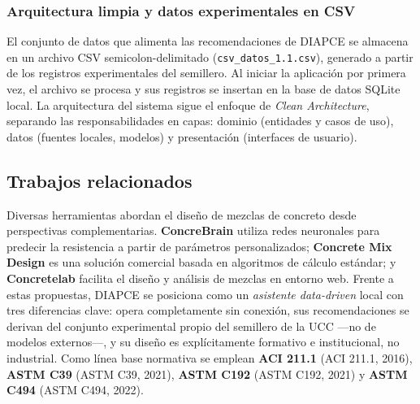 \subsubsection*{Arquitectura limpia y datos experimentales en CSV}

El conjunto de datos que alimenta las recomendaciones de DIAPCE se almacena en un archivo CSV semicolon-delimitado (\texttt{csv\_datos\_1.1.csv}), generado a partir de los registros experimentales del semillero. Al iniciar la aplicación por primera vez, el archivo se procesa y sus registros se insertan en la base de datos SQLite local. La arquitectura del sistema sigue el enfoque de \textit{Clean Architecture}, separando las responsabilidades en capas: dominio (entidades y casos de uso), datos (fuentes locales, modelos) y presentación (interfaces de usuario).

\subsection{Trabajos relacionados}

Diversas herramientas abordan el diseño de mezclas de concreto desde perspectivas complementarias. \textbf{ConcreBrain} utiliza redes neuronales para predecir la resistencia a partir de parámetros personalizados; \textbf{Concrete Mix Design} es una solución comercial basada en algoritmos de cálculo estándar; y \textbf{Concretelab} facilita el diseño y análisis de mezclas en entorno web. Frente a estas propuestas, DIAPCE se posiciona como un \textit{asistente data-driven} local con tres diferencias clave: opera completamente sin conexión, sus recomendaciones se derivan del conjunto experimental propio del semillero de la UCC ---no de modelos externos---, y su diseño es explícitamente formativo e institucional, no industrial. Como línea base normativa se emplean \textbf{ACI 211.1} (ACI 211.1, 2016), \textbf{ASTM C39} (ASTM C39, 2021), \textbf{ASTM C192} (ASTM C192, 2021) y \textbf{ASTM C494} (ASTM C494, 2022).
